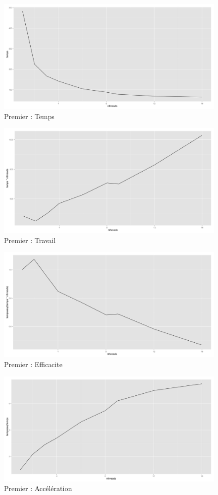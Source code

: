 \documentclass[a4paper,11pt]{article}
\begin{document}
\begin{figure}[htbp]
  \centering
  \includegraphics[scale=0.35]{img/premier_temps.png}
  \caption{Premier : Temps}
\end{figure}

\begin{figure}[htbp]
  \centering
  \includegraphics[scale=0.35]{img/premier_travail.png}
  \caption{Premier : Travail}
\end{figure}

\begin{figure}[htbp]
  \centering
  \includegraphics[scale=0.35]{img/premier_efficacite.png}
  \caption{Premier : Efficacite}
\end{figure}

\begin{figure}[htbp]
  \centering
  \includegraphics[scale=0.35]{img/premier_acceleration.png}
  \caption{Premier : Accélération}
\end{figure}
\end{document}
